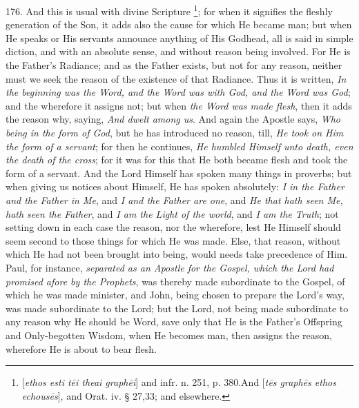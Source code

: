 176. And this is usual with
divine Scripture \footnote{[\emph{ethos esti t\={e}i theai graph\={e}i}] and infr. n. 251,
p. 380.\emph{}And [\emph{t\={e}s graph\={e}s ethos echous\={e}s}],
and Orat. iv. § 27,\emph{}33; and elsewhere.}; for
when it signifies the fleshly generation of the Son, it adds also the
cause for which He became man; but when He speaks or His servants
announce anything of His Godhead, all is said in simple diction, and
with an absolute sense, and without reason being involved. For He is
the Father's Radiance; and as the Father exists, but not for any
reason, neither must we seek the reason of the existence of that
Radiance. Thus it is written, \emph{In the beginning was the Word, and
the Word was with God, and the Word was God}; and the wherefore it
assigns not; but when \emph{the Word was made flesh}, then it adds the
reason why, saying, \emph{And dwelt among us}. And again the Apostle
says, \emph{Who being in the form of God}, but he has introduced no
reason, till, \emph{He took on Him the form of a servant}; for then he
continues, \emph{He humbled Himself unto death, even the death of the
cross}; for it was for this that He both became flesh and took the
form of a servant. And the Lord Himself has spoken many things in
proverbs; but when giving us notices about Himself, He has spoken
absolutely: \emph{I in the Father and the Father in Me}, and \emph{I and
the Father are one}, and \emph{He that hath seen Me, hath seen the
Father}, and \emph{I am the Light of the world}, and \emph{I am the
Truth}; not setting down in each case the reason, nor the
wherefore, lest He Himself should seem second to those things for
which He was made. Else, that reason, without which He had not been
brought into being, would needs take precedence of Him. Paul,
for instance, \emph{separated as an Apostle for the Gospel, which the
Lord had promised afore by the Prophets}, was thereby made
subordinate to the Gospel, of which he was made minister, and John,
being chosen to prepare the Lord's way, was made subordinate to the
Lord; but the Lord, not being made subordinate to any reason why He
should be Word, save only that He is the Father's Offspring and
Only-begotten Wisdom, when He becomes man, then assigns the reason,
wherefore He is about to bear flesh.

